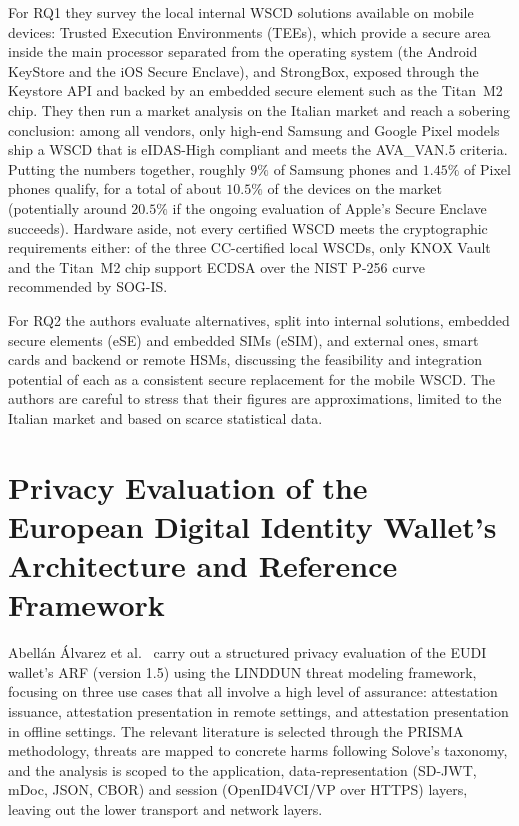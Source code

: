 \documentclass[binding=0.6cm,oneside,noexaminfo]{sapthesis}
\begin{document}
For RQ1 they survey the local internal WSCD solutions available on mobile devices: Trusted Execution Environments
(TEEs), which provide a secure area inside the main processor separated from the operating system (the Android KeyStore
and the iOS Secure Enclave), and StrongBox, exposed through the Keystore API and backed by an embedded secure element
such as the Titan~M2 chip. They then run a market analysis on the Italian market and reach a sobering conclusion: among
all vendors, only high-end Samsung and Google Pixel models ship a WSCD that is eIDAS-High compliant and meets the
AVA\_VAN.5 criteria. Putting the numbers together, roughly $9\%$ of Samsung phones and $1.45\%$ of Pixel phones
qualify, for a total of about $10.5\%$ of the devices on the market (potentially around $20.5\%$ if the ongoing
evaluation of Apple's Secure Enclave succeeds). Hardware aside, not every certified WSCD meets the cryptographic
requirements either: of the three CC-certified local WSCDs, only KNOX Vault and the Titan~M2 chip support ECDSA over
the NIST P-256 curve recommended by SOG-IS.

For RQ2 the authors evaluate alternatives, split into internal solutions, embedded secure elements (eSE) and embedded
SIMs (eSIM), and external ones, smart cards and backend or remote HSMs, discussing the feasibility and integration
potential of each as a consistent secure replacement for the mobile WSCD. The authors are careful to stress that their
figures are approximations, limited to the Italian market and based on scarce statistical data.

\section{Privacy Evaluation of the European Digital Identity Wallet’s Architecture and Reference Framework}
\label{privevaleudi}
Abellán Álvarez et al.~\cite{AbellanAlvarez2026Privacy} carry out a structured privacy evaluation of the EUDI wallet's
ARF (version 1.5) using the LINDDUN threat modeling framework, focusing on three use cases that all involve a high
level of assurance: attestation issuance, attestation presentation in remote settings, and attestation presentation in
offline settings. The relevant literature is selected through the PRISMA methodology, threats are mapped to concrete
harms following Solove's taxonomy, and the analysis is scoped to the application, data-representation (SD-JWT, mDoc,
JSON, CBOR) and session (OpenID4VCI/VP over HTTPS) layers, leaving out the lower transport and network layers.
\end{document}
